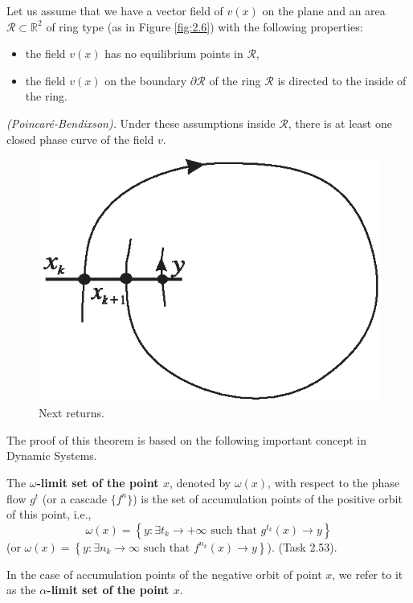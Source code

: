 Let us assume that we have a vector field of $ v (x) $ on the plane and an area $\mathcal{R}\subset \mathbb{R}^{2}$ of ring type (as in Figure \ref{fig:2.6}) with the following properties:
\begin{itemize}
	\item the field $ v (x) $ has no equilibrium points in $ \mathcal {R} $,
	\item the field  $ v (x) $ on the boundary $ \partial \mathcal {R} $ of the ring $\mathcal {R} $ is directed to the inside of the ring.
\end{itemize}

\begin{theorem}\emph{(Poincaré-Bendixson).}\label{theo:2.17}
	Under these assumptions inside $ \mathcal {R} $, there is at least one closed phase curve of the field $ v $.
\end{theorem}

\begin{figure}[!ht]
	\centering
	\includegraphics [scale=1.05]{jtr27}
	\caption{Next returns.}
	\label{fig:2.7}
\end{figure}

The proof of this theorem is based on the following important concept in Dynamic Systems.

\begin{definition}
	The \textbf{$\omega$-limit set of the point $x$}, denoted by $\omega(x)$, with respect to the phase flow $g^t$ (or a cascade $\{f^n\}$) is the set of accumulation points of the positive orbit of this point, i.e.,
	$$
	\omega (x)=\left\{ y:\exists t_{k}\rightarrow +\infty \text{ such that }%
	g^{t_{k}}(x)\rightarrow y\right\}
	$$
	(or $\omega (x)=\left\{ y:\exists n_{k}\rightarrow \infty \text{ such that } f^{n_{k}}(x)\rightarrow y\right\} $). (Task 2.53).
	
	In the case of accumulation points of the negative orbit of point $x$, we refer to it as the \textbf{$\alpha$-limit set of the point $ x $}.
\end{definition}

